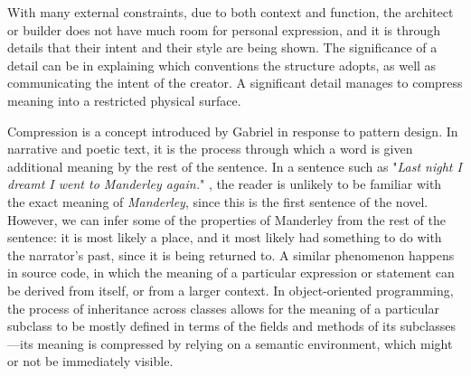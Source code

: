 With many external constraints, due to both context and function, the architect or builder does not have much room for personal expression, and it is through details that their intent and their style are being shown. The significance of a detail can be in explaining which conventions the structure adopts, as well as communicating the intent of the creator. A significant detail manages to compress meaning into a restricted physical surface.

Compression is a concept introduced by Gabriel in response to pattern design. In narrative and poetic text, it is the process through which a word is given additional meaning by the rest of the sentence. In a sentence such as "\emph{Last night I dreamt I went to Manderley again.}" \citep{dumaurier_rebecca_1938}, the reader is unlikely to be familiar with the exact meaning of \emph{Manderley}, since this is the first sentence of the novel. However, we can infer some of the properties of Manderley from the rest of the sentence: it is most likely a place, and it most likely had something to do with the narrator's past, since it is being returned to. A similar phenomenon happens in source code, in which the meaning of a particular expression or statement can be derived from itself, or from a larger context. In object-oriented programming, the process of inheritance across classes allows for the meaning of a particular subclass to be mostly defined in terms of the fields and methods of its subclasses—its meaning is compressed by relying on a semantic environment, which might or not be immediately visible.

